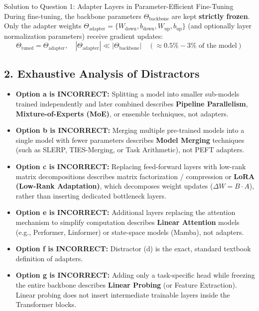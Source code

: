 \documentclass[11pt,a4paper]{article}
\begin{document}
\begin{solutionbox}{Solution to Question 1: Adapter Layers in Parameter-Efficient Fine-Tuning}
During fine-tuning, the backbone parameters $\Theta_{\text{backbone}}$ are kept \textbf{strictly frozen}. Only the adapter weights $\Theta_{\text{adapter}} = \{W_{\text{down}}, b_{\text{down}}, W_{\text{up}}, b_{\text{up}}\}$ (and optionally layer normalization parameters) receive gradient updates:
\begin{equation}
    \Theta_{\text{tuned}} = \Theta_{\text{adapter}}, \quad |\Theta_{\text{adapter}}| \ll |\Theta_{\text{backbone}}| \quad (\approx 0.5\% - 3\% \text{ of the model})
\end{equation}

\subsection*{2. Exhaustive Analysis of Distractors}
\begin{itemize}[leftmargin=1.5em,itemsep=3pt]
    \item \textbf{Option a is INCORRECT:} Splitting a model into smaller sub-models trained independently and later combined describes \textbf{Pipeline Parallelism}, \textbf{Mixture-of-Experts (MoE)}, or ensemble techniques, not adapters.
    \item \textbf{Option b is INCORRECT:} Merging multiple pre-trained models into a single model with fewer parameters describes \textbf{Model Merging} techniques (such as SLERP, TIES-Merging, or Task Arithmetic), not PEFT adapters.
    \item \textbf{Option c is INCORRECT:} Replacing feed-forward layers with low-rank matrix decompositions describes matrix factorization / compression or \textbf{LoRA (Low-Rank Adaptation)}, which decomposes weight updates ($\Delta W = B \cdot A$), rather than inserting dedicated bottleneck layers.
    \item \textbf{Option e is INCORRECT:} Additional layers replacing the attention mechanism to simplify computation describes \textbf{Linear Attention} models (e.g., Performer, Linformer) or state-space models (Mamba), not adapters.
    \item \textbf{Option f is INCORRECT:} Distractor (d) is the exact, standard textbook definition of adapters.
    \item \textbf{Option g is INCORRECT:} Adding only a task-specific head while freezing the entire backbone describes \textbf{Linear Probing} (or Feature Extraction). Linear probing does not insert intermediate trainable layers inside the Transformer blocks.
\end{itemize}
\end{solutionbox}
\end{document}
